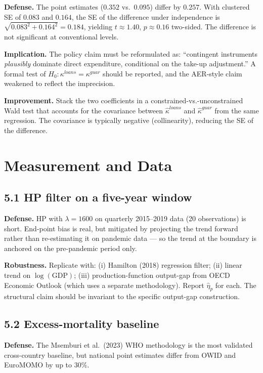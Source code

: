 \documentclass[11pt,a4paper]{article}
\begin{document}
\textbf{Defense.} The point estimates ($0.352$ vs.\ $0.095$) differ by $0.257$. With clustered SE of $0.083$ and $0.164$, the SE of the difference under independence is $\sqrt{0.083^2 + 0.164^2} = 0.184$, yielding $t \approx 1.40$, $p \approx 0.16$ two-sided. The difference is not significant at conventional levels.

\textbf{Implication.} The policy claim must be reformulated as: ``contingent instruments \emph{plausibly} dominate direct expenditure, conditional on the take-up adjustment.'' A formal test of $H_0: \kappa^{loans} = \kappa^{guar}$ should be reported, and the AER-style claim weakened to reflect the imprecision.

\textbf{Improvement.} Stack the two coefficients in a constrained-vs.-unconstrained Wald test that accounts for the covariance between $\hat\kappa^{loans}$ and $\hat\kappa^{guar}$ from the same regression. The covariance is typically negative (collinearity), reducing the SE of the difference.

\section{Measurement and Data}

\subsection*{5.1 HP filter on a five-year window}

\textbf{Defense.} HP with $\lambda = 1600$ on quarterly 2015--2019 data (20 observations) is short. End-point bias is real, but mitigated by projecting the trend forward rather than re-estimating it on pandemic data --- so the trend at the boundary is anchored on the pre-pandemic period only.

\textbf{Robustness.} Replicate with: (i) Hamilton (2018) regression filter; (ii) linear trend on $\log(\text{GDP})$; (iii) production-function output-gap from OECD Economic Outlook (which uses a separate methodology). Report $\hat\eta_p$ for each. The structural claim should be invariant to the specific output-gap construction.

\subsection*{5.2 Excess-mortality baseline}

\textbf{Defense.} The Msemburi et al.\ (2023) WHO methodology is the most validated cross-country baseline, but national point estimates differ from OWID and EuroMOMO by up to $30\%$.
\end{document}
